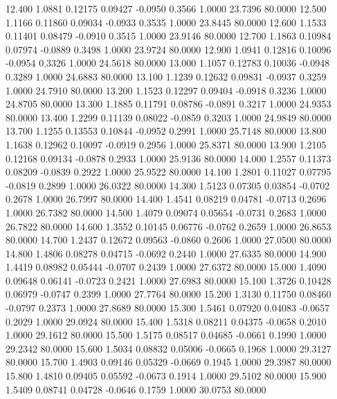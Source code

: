   12.400   1.0881   0.12175   0.09427  -0.0950   0.3566   1.0000  23.7396  80.0000
  12.500   1.1166   0.11860   0.09034  -0.0933   0.3535   1.0000  23.8445  80.0000
  12.600   1.1533   0.11401   0.08479  -0.0910   0.3515   1.0000  23.9146  80.0000
  12.700   1.1863   0.10984   0.07974  -0.0889   0.3498   1.0000  23.9724  80.0000
  12.900   1.0941   0.12816   0.10096  -0.0954   0.3326   1.0000  24.5618  80.0000
  13.000   1.1057   0.12783   0.10036  -0.0948   0.3289   1.0000  24.6883  80.0000
  13.100   1.1239   0.12632   0.09831  -0.0937   0.3259   1.0000  24.7910  80.0000
  13.200   1.1523   0.12297   0.09404  -0.0918   0.3236   1.0000  24.8705  80.0000
  13.300   1.1885   0.11791   0.08786  -0.0891   0.3217   1.0000  24.9353  80.0000
  13.400   1.2299   0.11139   0.08022  -0.0859   0.3203   1.0000  24.9849  80.0000
  13.700   1.1255   0.13553   0.10844  -0.0952   0.2991   1.0000  25.7148  80.0000
  13.800   1.1638   0.12962   0.10097  -0.0919   0.2956   1.0000  25.8371  80.0000
  13.900   1.2105   0.12168   0.09134  -0.0878   0.2933   1.0000  25.9136  80.0000
  14.000   1.2557   0.11373   0.08209  -0.0839   0.2922   1.0000  25.9522  80.0000
  14.100   1.2801   0.11027   0.07795  -0.0819   0.2899   1.0000  26.0322  80.0000
  14.300   1.5123   0.07305   0.03854  -0.0702   0.2678   1.0000  26.7997  80.0000
  14.400   1.4541   0.08219   0.04781  -0.0713   0.2696   1.0000  26.7382  80.0000
  14.500   1.4079   0.09074   0.05654  -0.0731   0.2683   1.0000  26.7822  80.0000
  14.600   1.3552   0.10145   0.06776  -0.0762   0.2659   1.0000  26.8653  80.0000
  14.700   1.2437   0.12672   0.09563  -0.0860   0.2606   1.0000  27.0500  80.0000
  14.800   1.4806   0.08278   0.04715  -0.0692   0.2440   1.0000  27.6335  80.0000
  14.900   1.4419   0.08982   0.05444  -0.0707   0.2439   1.0000  27.6372  80.0000
  15.000   1.4090   0.09648   0.06141  -0.0723   0.2421   1.0000  27.6983  80.0000
  15.100   1.3726   0.10428   0.06979  -0.0747   0.2399   1.0000  27.7764  80.0000
  15.200   1.3130   0.11750   0.08460  -0.0797   0.2373   1.0000  27.8689  80.0000
  15.300   1.5461   0.07920   0.04083  -0.0657   0.2029   1.0000  29.0924  80.0000
  15.400   1.5318   0.08211   0.04375  -0.0658   0.2010   1.0000  29.1612  80.0000
  15.500   1.5175   0.08517   0.04685  -0.0661   0.1990   1.0000  29.2342  80.0000
  15.600   1.5034   0.08832   0.05006  -0.0665   0.1968   1.0000  29.3127  80.0000
  15.700   1.4903   0.09146   0.05329  -0.0669   0.1945   1.0000  29.3987  80.0000
  15.800   1.4810   0.09405   0.05592  -0.0673   0.1914   1.0000  29.5102  80.0000
  15.900   1.5409   0.08741   0.04728  -0.0646   0.1759   1.0000  30.0753  80.0000
